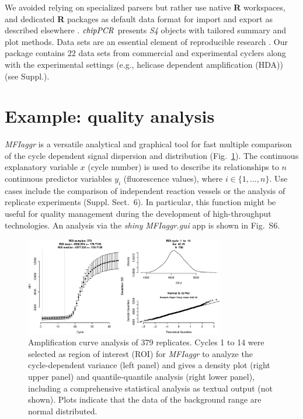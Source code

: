 \documentclass{bioinfo}
\begin{document}
\begin{methods}
We avoided relying on specialized parsers but rather use native \textbf{R} 
workspaces, and dedicated \textbf{R} packages as default data format for import 
and export as described elsewhere \citep{perkins_2012, RCT_2013}. 
$\emph{chipPCR}$ presents \emph{S4} objects with tailored summary and plot 
methods. Data sets are an essential element of reproducible research 
\citep{Leeper_2014}. Our package contains 22 data sets from commercial and 
experimental cyclers along with the experimental settings (e.g., helicase 
dependent amplification (HDA)) (see Suppl.). %
\end{methods}

\section{Example: quality analysis}

\textsl{MFIaggr} is a versatile analytical and graphical tool for fast multiple 
comparison of the cycle dependent signal dispersion and distribution 
(Fig.~\ref{fig:01}). The continuous explanatory variable $x$ (cycle number) is 
used to describe its relationships to $n$ continuous predictor variables $y_i$ 
(fluorescence values), where $i \in \{1, ..., n\}$. Use cases include the 
comparison of independent reaction vessels or 
the analysis of replicate experiments (Suppl. Sect.~6). In %
particular, this function might be useful for quality management during the 
development of high-throughput technologies. An analysis via the \emph{shiny} 
\textsl{MFIaggr.gui} app is shown in Fig.~S6. %

\begin{figure}[!tpb]%
\centerline{\includegraphics[width=8.7cm]{fig01.eps}}
\caption{Amplification curve analysis of 379 replicates. Cycles 1 to 14 were 
selected as region of interest (ROI) for \textsl{MFIaggr} to analyze the 
cycle-dependent variance (left panel) and gives a density plot (right upper 
panel) and quantile-quantile analysis (right lower panel), including a 
comprehensive statistical analysis as textual output (not shown). Plots 
indicate that the data of the background range are normal 
distributed.}\label{fig:01}
\end{figure}
\end{document}
